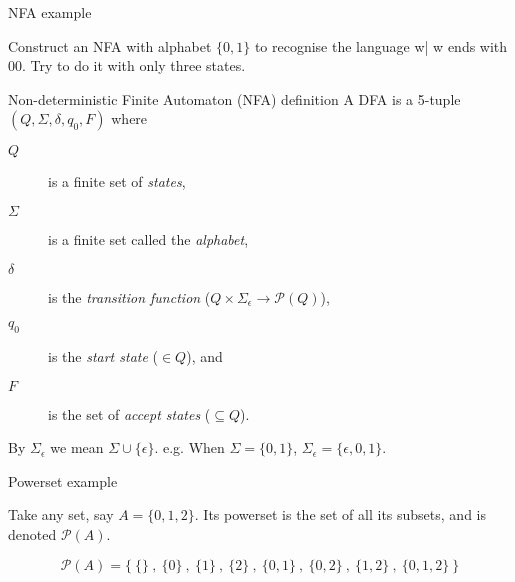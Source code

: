 \begin{frame}[fragile]{NFA example}
  \begin{center}
    Construct an NFA with alphabet $\{0, 1\}$ to recognise the language {w| w ends with 00}. Try to do it with only three states.
  \end{center}
  \begin{center}
  \end{center}
\end{frame}


\begin{frame}[fragile]{Non-deterministic Finite Automaton (NFA) definition}
  A DFA is a 5-tuple $(Q,\Sigma,\delta,q_0,F)$ where
  \begin{description}
    \item[$Q$] is a finite set of \emph{states},
    \item[$\Sigma$] is a finite set called the \emph{alphabet},
    \item[$\delta$] is the \emph{transition function} ($Q \times \Sigma_{\epsilon} \rightarrow \mathcal{P}(Q)$),
    \item[$q_0$] is the \emph{start state} ($\in Q$), and
    \item[$F$] is the set of \emph{accept states} ($\subseteq Q$). 
  \end{description}
  \vspace{5mm}
  By $\Sigma_{\epsilon}$ we mean $\Sigma \cup \{ \epsilon \}$.
  e.g. When $\Sigma = \{0,1\}$, $\Sigma_{\epsilon} = \{\epsilon,0,1\}.$
\end{frame}

\begin{frame}[fragile]{Powerset example}

  Take any set, say $A = \{0,1,2\}$.
  Its powerset is the set of all its subsets, and is denoted $\mathcal{P}(A)$.


  $$
  \mathcal{P}(A) = \Big\{ \ 
                      \{ \} \  , \  \{ 0 \} \  , \  \{ 1 \} \  ,\   \{ 2 \} \  , \ 
                      \{ 0,1 \} \  , \  \{ 0,2 \} \  , \  \{ 1,2 \} \  , \ 
                      \{ 0,1,2 \} \ 
                    \Big\}
  $$


\end{frame}
